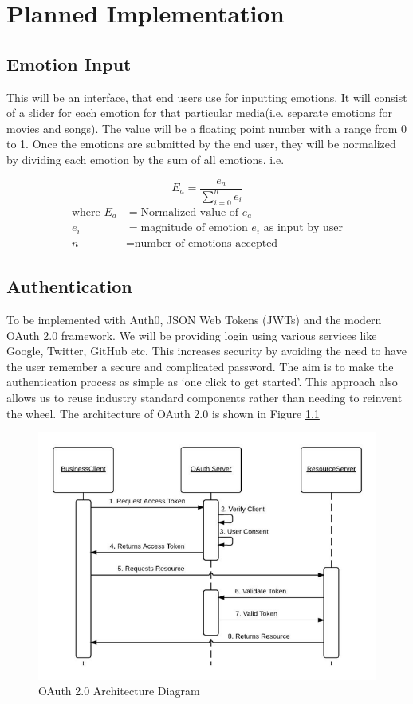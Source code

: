 \chapter{Planned Implementation}
\section{Emotion Input}
This will be an interface, that end users use for inputting emotions. It will consist of a slider for each emotion for that particular media(i.e. separate emotions for movies and songs). The value will be a floating point number with a range from 0 to 1. Once the emotions are submitted by the end user, they will be normalized by dividing each emotion by the sum of all emotions. i.e.

 $$ E_{a} = \frac{e_{a}}{\sum_{i=0}^{n}{e_{i}}} $$
\begin{align*}
\text{where } E_{a} &= \text{Normalized value of } e_{a}  \\
e_{i} &= \text{magnitude of emotion } e_{i} \text{ as input by user}\\
n &= \text{number of emotions accepted}
\end{align*}

\section{Authentication}
To be implemented with Auth0, JSON Web Tokens (JWTs) and the modern OAuth 2.0 framework. We will be providing login using various services like Google, Twitter, GitHub etc. This increases security by avoiding the need to have the user remember a secure and complicated password. The aim is to make the authentication process as simple as ‘one click to get started’. This approach also allows us to reuse industry standard components rather than needing to reinvent the wheel. The architecture of OAuth 2.0 is shown in Figure \ref{fig: oAuth uml}

\begin{figure}[H]
\centering
\includegraphics[width=\textwidth]{imgs/oAuth.png}
\caption{OAuth 2.0 Architecture Diagram}
\label{fig: oAuth uml}
\end{figure}
